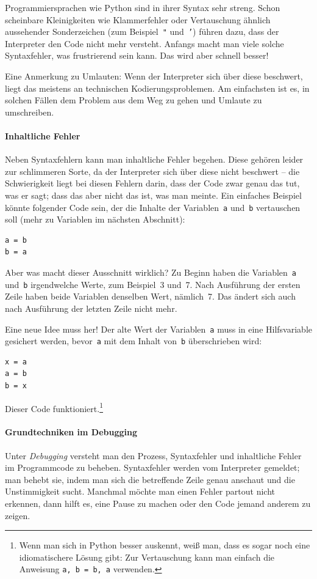 \documentclass{blatt}
\begin{document}
Programmiersprachen wie Python sind in ihrer Syntax sehr streng. Schon
scheinbare Kleinigkeiten wie Klammerfehler oder Vertauschung ähnlich
aussehender Sonderzeichen (zum Beispiel~\texttt{"} und~\texttt{'}) führen
dazu, dass der Interpreter den Code nicht mehr versteht. Anfangs macht man
viele solche Syntaxfehler, was frustrierend sein kann. Das wird
aber schnell besser!

Eine Anmerkung zu Umlauten: Wenn der Interpreter sich über diese beschwert,
liegt das meistens an technischen Kodierungsproblemen. Am einfachsten ist es,
in solchen Fällen dem Problem aus dem Weg zu gehen und Umlaute zu umschreiben.

\paragraph{Inhaltliche Fehler} Neben Syntaxfehlern kann man inhaltliche Fehler
begehen. Diese gehören leider zur schlimmeren Sorte, da der Interpreter sich
über diese nicht beschwert -- die Schwierigkeit liegt bei diesen Fehlern darin,
dass der Code zwar genau das tut, was er sagt; dass das aber nicht das ist, was
man meinte. Ein einfaches Beispiel könnte folgender Code sein, der die Inhalte
der Variablen~\texttt{a} und~\texttt{b} vertauschen soll (mehr zu Variablen im
nächsten Abschnitt):
\begin{verbatim}
a = b
b = a
\end{verbatim}
Aber was macht dieser Ausschnitt wirklich? Zu Beginn haben die
Variablen~\texttt{a} und~\texttt{b} irgendwelche Werte, zum Beispiel~3 und~7.
Nach Ausführung der ersten Zeile haben beide Variablen denselben Wert,
nämlich~7.  Das ändert sich auch nach Ausführung der letzten Zeile nicht mehr.

Eine neue Idee muss her! Der alte Wert der Variablen~\texttt{a} muss in eine
Hilfsvariable gesichert werden, bevor~\texttt{a} mit dem Inhalt von~\texttt{b}
überschrieben wird:
\begin{verbatim}
x = a
a = b
b = x
\end{verbatim}
Dieser Code funktioniert.\footnote{Wenn man sich in Python besser auskennt,
weiß man, dass es sogar noch eine idiomatischere Lösung gibt: Zur Vertauschung
kann man einfach die Anweisung \texttt{a, b = b, a} verwenden.}


\paragraph{Grundtechniken im Debugging} Unter \emph{Debugging} versteht man den
Prozess, Syntaxfehler und inhaltliche Fehler im Programmcode zu beheben.
Syntaxfehler werden vom Interpreter gemeldet; man behebt sie, indem man sich
die betreffende Zeile genau anschaut und die Unstimmigkeit sucht. Manchmal
möchte man einen Fehler partout nicht erkennen, dann hilft es, eine Pause zu
machen oder den Code jemand anderem zu zeigen.
\end{document}
